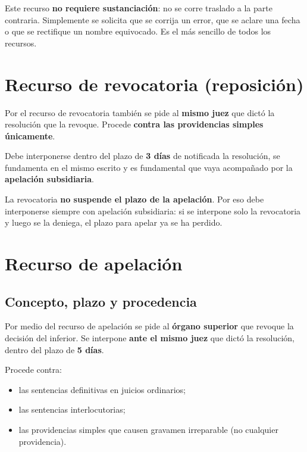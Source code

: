 \documentclass[12pt,oneside]{book}
\begin{document}
Este recurso \textbf{no requiere sustanciaci\'on}: no se corre traslado a la parte contraria. Simplemente se solicita que se corrija un error, que se aclare una fecha o que se rectifique un nombre equivocado. Es el m\'as sencillo de todos los recursos.

\section{Recurso de revocatoria (reposici\'on)}

Por el recurso de revocatoria tambi\'en se pide al \textbf{mismo juez} que dict\'o la resoluci\'on que la revoque. Procede \textbf{contra las providencias simples \'unicamente}.

Debe interponerse dentro del plazo de \textbf{3 d\'ias} de notificada la resoluci\'on, se fundamenta en el mismo escrito y es fundamental que vaya acompa\~nado por la \textbf{apelaci\'on subsidiaria}.

\begin{important}
La revocatoria \textbf{no suspende el plazo de la apelaci\'on}. Por eso debe interponerse siempre con apelaci\'on subsidiaria: si se interpone solo la revocatoria y luego se la deniega, el plazo para apelar ya se ha perdido.
\end{important}

\section{Recurso de apelaci\'on}

\subsection{Concepto, plazo y procedencia}

Por medio del recurso de apelaci\'on se pide al \textbf{\'organo superior} que revoque la decisi\'on del inferior. Se interpone \textbf{ante el mismo juez} que dict\'o la resoluci\'on, dentro del plazo de \textbf{5 d\'ias}.

Procede contra:
\begin{itemize}
    \item las sentencias definitivas en juicios ordinarios;
    \item las sentencias interlocutorias;
    \item las providencias simples que causen gravamen irreparable (no cualquier providencia).
\end{itemize}
\end{document}
